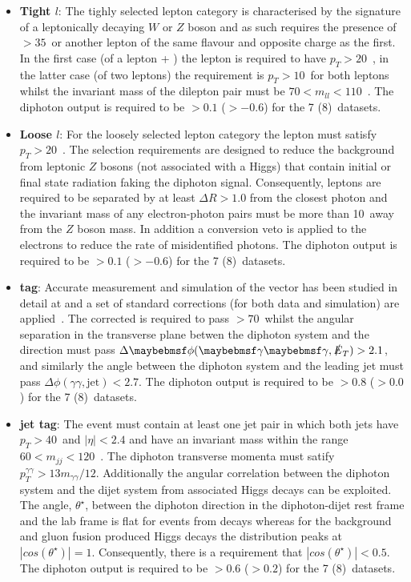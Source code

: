 \begin{itemize}
  \item \textbf{\VH Tight $l$}: The tighly selected lepton category is characterised by the signature of a leptonically decaying $W$ or $Z$ boson and as such requires the presence of \MET$>35$~\GeV or another lepton of the same flavour and opposite charge as the first. In the first case (of a lepton + \MET) the lepton is required to have $p_{T}>20$~\GeV, in the latter case (of two leptons) the requirement is $p_{T}>10$~\GeV for both leptons whilst the invariant mass of the dilepton pair must be $70 < m_{ll} < 110$~\GeV. The diphoton \BDT output is required to be $>0.1$ ($>-0.6$) for the 7 (8)~\TeV datasets.
  \item \textbf{\VH Loose $l$}: For the loosely selected lepton category the lepton \pT must satisfy $p_{T}>20$~\GeV. The selection requirements are designed to reduce the background from leptonic $Z$ bosons (not associated with a Higgs) that contain initial or final state radiation faking the diphoton signal. Consequently, leptons are required to be separated by at least $\Delta R>1.0$ from the closest photon and the invariant mass of any electron-photon pairs must be more than 10~\GeV away from the $Z$ boson mass. In addition a conversion veto is applied to the electrons to reduce the rate of misidentified photons. The diphoton \BDT output is required to be $>0.1$ ($>-0.6$) for the 7 (8)~\TeV datasets.
  \item \textbf{\VH \MET tag}: Accurate measurement and simulation of the \MET vector has been studied in detail at \CMS and a set of standard corrections (for both data and simulation) are applied~\cite{met_corrs}. The corrected \MET is required to pass \MET$>70$~\GeV whilst the angular separation in the transverse plane betwen the diphoton system and the \MET direction must pass $\Delta\phi(\gamma\gamma,\MET)>2.1$, and similarly the angle between the diphoton system and the leading jet must pass $\Delta\phi(\gamma\gamma,\mbox{jet})<2.7$. The diphoton \BDT output is required to be $>0.8$ ($>0.0$) for the 7 (8)~\TeV datasets.   
  \item \textbf{\VH jet tag}: The event must contain at least one jet pair in which both jets have $p_{T}>40$~\GeV and $|\eta|<2.4$ and have an invariant mass within the range $60<m_{jj}<120$~\GeV. The diphoton transverse momenta must satify $p_{T}^{\gamma\gamma}>13m_{\gamma\gamma}/12$. Additionally the angular correlation between the diphoton system and the dijet system from \VH associated Higgs decays can be exploited. The angle, $\theta^{\star}$, between the diphoton direction in the diphoton-dijet rest frame and the lab frame is flat for events from \VH decays whereas for the background and gluon fusion produced Higgs decays the distribution peaks at $|cos(\theta^{\star})|=1$. Consequently, there is a requirement that $|cos(\theta^{\star})|<0.5$. The diphoton \BDT output is required to be $>0.6$ ($>0.2$) for the 7 (8)~\TeV datasets. 
\end{itemize}

